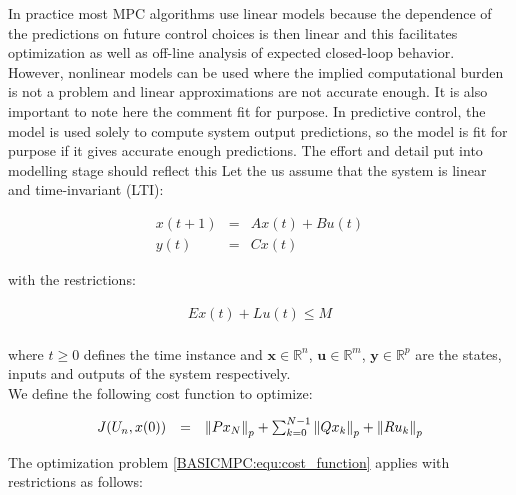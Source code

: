 	In practice most MPC algorithms use linear models because the dependence of the predictions on future control choices is then linear and this facilitates optimization as well as off-line analysis of expected closed-loop behavior. However, nonlinear
models can be used where the implied computational burden is not a problem and linear approximations are not accurate enough.
It is also important to note here the comment fit for purpose. In predictive control, the model is used solely to compute system output predictions, so the model is fit for purpose if it gives accurate enough predictions. The effort and detail put into
modelling stage should reflect this
	Let the us assume that the system is linear and time-invariant (LTI):
	
	    \begin{equation}
        \begin{array}{rcl}
            x(t+1)&=&Ax(t)+Bu(t)\\
						y(t)&=&Cx(t)
        \end{array}
        \label{BASICMPC:equ:basic_LTI}
    \end{equation}
		
	with the restrictions:
	
	\begin{equation}
        \begin{array}{rcl}
            Ex(t)+Lu(t)\leq M\\
        \end{array}
        \label{BASICMPC:equ:restrict_LTI}
    \end{equation}
		
		where $t\geq0$ defines the time instance and $\textbf{x}\in \mathbb{R}^n$, $\textbf{u}\in \mathbb{R}^m$, $\textbf{y}\in \mathbb{R}^p$ are the states, inputs and outputs of the system respectively. \\
	 We define the following cost function to optimize:
		
		\begin{equation}
        \begin{array}{rcl}
         J(U_n,x(0))&=&\left\lVert{Px_N}\right\rVert_p+\sum^{N-1}_{k=0}\left\lVert Qx_k\right\rVert_p+\left\lVert Ru_k\right\rVert_p\\
        \end{array}
        \label{BASICMPC:equ:cost_function}
    \end{equation}
		
		The optimization problem \ref{BASICMPC:equ:cost_function} applies with restrictions as follows:
		
